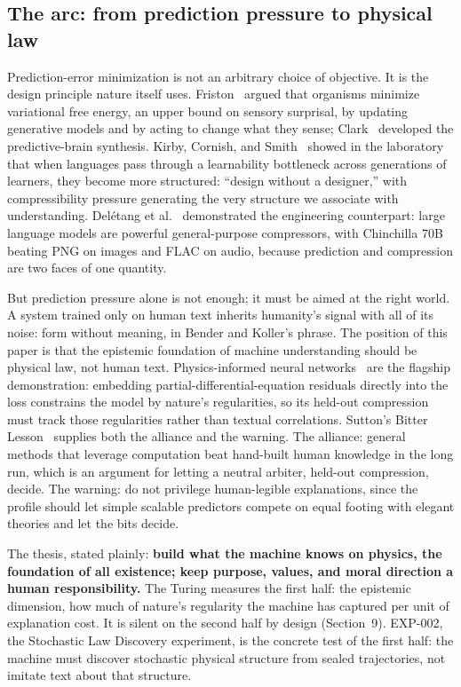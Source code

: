 \documentclass[11pt]{article}
\begin{document}
\subsection{The arc: from prediction pressure to physical law}

Prediction-error minimization is not an arbitrary choice of objective. It is the design principle nature itself uses. Friston~\cite{friston2010} argued that organisms minimize variational free energy, an upper bound on sensory surprisal, by updating generative models and by acting to change what they sense; Clark~\cite{clark2013} developed the predictive-brain synthesis. Kirby, Cornish, and Smith~\cite{kirby2008} showed in the laboratory that when languages pass through a learnability bottleneck across generations of learners, they become more structured: ``design without a designer,'' with compressibility pressure generating the very structure we associate with understanding. Del{\'e}tang et al.~\cite{deletang2024} demonstrated the engineering counterpart: large language models are powerful general-purpose compressors, with Chinchilla 70B beating PNG on images and FLAC on audio, because prediction and compression are two faces of one quantity.

But prediction pressure alone is not enough; it must be aimed at the right world. A system trained only on human text inherits humanity's signal with all of its noise: form without meaning, in Bender and Koller's phrase. The position of this paper is that the epistemic foundation of machine understanding should be physical law, not human text. Physics-informed neural networks~\cite{raissi2019} are the flagship demonstration: embedding partial-differential-equation residuals directly into the loss constrains the model by nature's regularities, so its held-out compression must track those regularities rather than textual correlations. Sutton's Bitter Lesson~\cite{sutton2019} supplies both the alliance and the warning. The alliance: general methods that leverage computation beat hand-built human knowledge in the long run, which is an argument for letting a neutral arbiter, held-out compression, decide. The warning: do not privilege human-legible explanations, since the profile should let simple scalable predictors compete on equal footing with elegant theories and let the bits decide.

The thesis, stated plainly: \textbf{build what the machine knows on physics, the foundation of all existence; keep purpose, values, and moral direction a human responsibility.} The Turing measures the first half: the epistemic dimension, how much of nature's regularity the machine has captured per unit of explanation cost. It is silent on the second half by design (Section~9). EXP-002, the Stochastic Law Discovery experiment, is the concrete test of the first half: the machine must discover stochastic physical structure from sealed trajectories, not imitate text about that structure.
\end{document}
